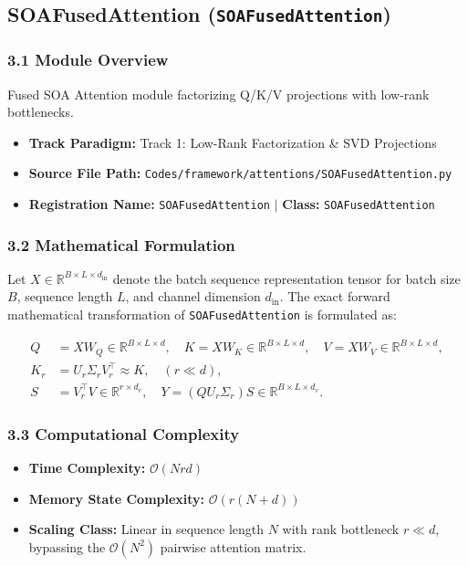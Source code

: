 \subsection{SOAFusedAttention (\texttt{SOAFusedAttention})}
\label{sec:app_module_SOAFusedAttention}

\subsubsection*{3.1 Module Overview}
Fused SOA Attention module factorizing Q/K/V projections with low-rank bottlenecks.
\begin{itemize}
    \item \textbf{Track Paradigm:} Track 1: Low-Rank Factorization \& SVD Projections
    \item \textbf{Source File Path:} \texttt{Codes/framework/attentions/SOAFusedAttention.py}
    \item \textbf{Registration Name:} \texttt{SOAFusedAttention} $\mid$ \textbf{Class:} \texttt{SOAFusedAttention}
\end{itemize}

\subsubsection*{3.2 Mathematical Formulation}
Let $X \in \mathbb{R}^{B \times L \times d_{\text{in}}}$ denote the batch sequence representation tensor for batch size $B$, sequence length $L$, and channel dimension $d_{\text{in}}$. The exact forward mathematical transformation of \texttt{SOAFusedAttention} is formulated as:

\begin{align}
Q &= X W_Q \in \mathbb{R}^{B \times L \times d}, \quad K = X W_K \in \mathbb{R}^{B \times L \times d}, \quad V = X W_V \in \mathbb{R}^{B \times L \times d}, \\
K_r &= U_r \Sigma_r V_r^\top \approx K, \quad (r \ll d), \\
S &= V_r^\top V \in \mathbb{R}^{r \times d_v}, \quad Y = (Q U_r \Sigma_r) S \in \mathbb{R}^{B \times L \times d_v}.
\end{align}


\subsubsection*{3.3 Computational Complexity}
\begin{itemize}
    \item \textbf{Time Complexity:} $\mathcal{O}(N r d)$
    \item \textbf{Memory State Complexity:} $\mathcal{O}(r(N + d))$
    \item \textbf{Scaling Class:} Linear in sequence length $N$ with rank bottleneck $r \ll d$, bypassing the $\mathcal{O}(N^2)$ pairwise attention matrix.
\end{itemize}


